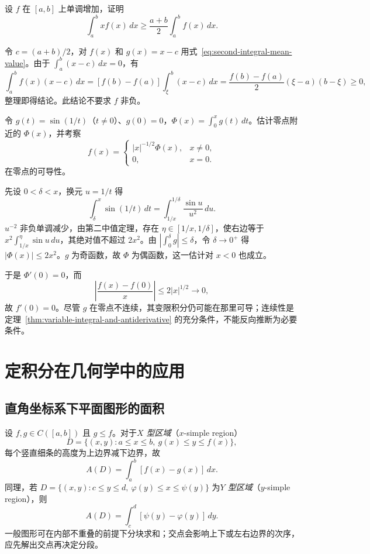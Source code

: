 \begin{example}
\label{ex:monotone-weighted-first-moment}
设 $f$ 在 $[a,b]$ 上单调增加，证明
\[
    \int_a^bxf(x)\,dx\geq\frac{a+b}{2}\int_a^bf(x)\,dx.
\]
\end{example}
\begin{solve}
令 $c=(a+b)/2$，对 $f(x)$ 和 $g(x)=x-c$ 用式~\eqref{eq:second-integral-mean-value}。由于 $\int_a^b(x-c)\,dx=0$，有
\[
    \int_a^bf(x)(x-c)\,dx
    =[f(b)-f(a)]\int_\xi^b(x-c)\,dx
    =\frac{f(b)-f(a)}2(\xi-a)(b-\xi)\geq0,
\]
整理即得结论。此结论不要求 $f$ 非负。
\end{solve}

\begin{example}
\label{ex:oscillatory-integral-at-zero}
令 $g(t)=\sin(1/t)$（$t\neq0$）、$g(0)=0$，$\Phi(x)=\int_0^xg(t)\,dt$。估计零点附近的 $\Phi(x)$，并考察
\[
    f(x)=
    \begin{cases}|x|^{-1/2}\Phi(x),&x\neq0,\\0,&x=0.\end{cases}
\]
在零点的可导性。
\end{example}
\begin{solve}
先设 $0<\delta<x$，换元 $u=1/t$ 得
\[
    \int_\delta^x\sin(1/t)\,dt
    =\int_{1/x}^{1/\delta}\frac{\sin u}{u^2}\,du.
\]
$u^{-2}$ 非负单调减少，由第二中值定理，存在 $\eta\in[1/x,1/\delta]$，使右边等于 $x^2\int_{1/x}^{\eta}\sin u\,du$，其绝对值不超过 $2x^2$。由 $|\int_0^\delta g|\leq\delta$，令 $\delta\to0^+$ 得 $|\Phi(x)|\leq2x^2$。$g$ 为奇函数，故 $\Phi$ 为偶函数，这一估计对 $x<0$ 也成立。

于是 $\Phi'(0)=0$，而
\[
    \left|\frac{f(x)-f(0)}x\right|
    \leq2|x|^{1/2}\longrightarrow0,
\]
故 $f'(0)=0$。尽管 $g$ 在零点不连续，其变限积分仍可能在那里可导；连续性是定理~\ref{thm:variable-integral-and-antiderivative} 的充分条件，不能反向推断为必要条件。
\end{solve}

\section{定积分在几何学中的应用}
\label{sec:geometric-applications-of-definite-integrals}

\subsection{直角坐标系下平面图形的面积}
\label{subsec:plane-areas-in-cartesian-coordinates}

设 $f,g\in C([a,b])$ 且 $g\leq f$。对于\emph{$X$ 型区域}（$x$-simple region）
\[
    D=\{(x,y):a\leq x\leq b,\ g(x)\leq y\leq f(x)\},
\]
每个竖直细条的高度为上边界减下边界，故
\begin{equation}
    A(D)=\int_a^b[f(x)-g(x)]\,dx.
    \label{eq:cartesian-area-x-simple}
\end{equation}
同理，若 $D=\{(x,y):c\leq y\leq d,\ \varphi(y)\leq x\leq\psi(y)\}$ 为\emph{$Y$ 型区域}（$y$-simple region），则
\[
    A(D)=\int_c^d[\psi(y)-\varphi(y)]\,dy.
\]
一般图形可在内部不重叠的前提下分块求和；交点会影响上下或左右边界的次序，应先解出交点再决定分段。

